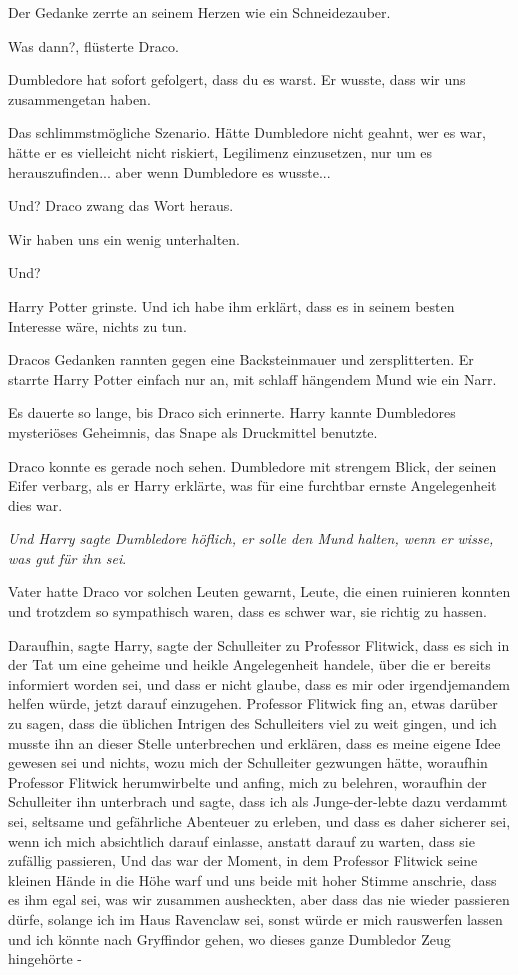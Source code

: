 Der Gedanke zerrte an seinem Herzen wie ein Schneidezauber.

\glqq{}Was dann?\grqq{}, flüsterte Draco.

\glqq{}Dumbledore hat sofort gefolgert, dass du es warst. Er wusste, dass wir
uns zusammengetan haben.\grqq{}

Das schlimmstmögliche Szenario. Hätte Dumbledore nicht geahnt, wer es war, hätte
er es vielleicht nicht riskiert, Legilimenz einzusetzen, nur um es
herauszufinden... aber wenn Dumbledore es wusste...

\glqq{}Und?\grqq{} Draco zwang das Wort heraus.

\glqq{}Wir haben uns ein wenig unterhalten.\grqq{}

\glqq{}Und?\grqq{}

Harry Potter grinste. \glqq{}Und ich habe ihm erklärt, dass es in seinem besten
Interesse wäre, nichts zu tun.\grqq{}

Dracos Gedanken rannten gegen eine Backsteinmauer und zersplitterten. Er starrte
Harry Potter einfach nur an, mit schlaff hängendem Mund wie ein Narr.

Es dauerte so lange, bis Draco sich erinnerte. Harry kannte Dumbledores
mysteriöses Geheimnis, das Snape als Druckmittel benutzte.

Draco konnte es gerade noch sehen. Dumbledore mit strengem Blick, der seinen
Eifer verbarg, als er Harry erklärte, was für eine furchtbar ernste
Angelegenheit dies war.


\emph{Und Harry sagte Dumbledore höflich, er solle den Mund halten, wenn er
wisse, was gut für ihn sei}.

Vater hatte Draco vor solchen Leuten gewarnt, Leute, die einen ruinieren konnten
und trotzdem so sympathisch waren, dass es schwer war, sie richtig zu hassen.

\glqq{}Daraufhin\grqq{}, sagte Harry, \glqq{}sagte der Schulleiter zu Professor
Flitwick, dass es sich in der Tat um eine geheime und heikle Angelegenheit
handele, über die er bereits informiert worden sei, und dass er nicht glaube,
dass es mir oder irgendjemandem helfen würde, jetzt darauf einzugehen. Professor
Flitwick fing an, etwas darüber zu sagen, dass die üblichen Intrigen des
Schulleiters viel zu weit gingen, und ich musste ihn an dieser Stelle
unterbrechen und erklären, dass es meine eigene Idee gewesen sei und nichts,
wozu mich der Schulleiter gezwungen hätte, woraufhin Professor Flitwick
herumwirbelte und anfing, mich zu belehren, woraufhin der Schulleiter ihn
unterbrach und sagte, dass ich als Junge-der-lebte dazu verdammt sei, seltsame
und gefährliche Abenteuer zu erleben, und dass es daher sicherer sei, wenn ich
mich absichtlich darauf einlasse, anstatt darauf zu warten, dass sie zufällig
passieren, Und das war der Moment, in dem Professor Flitwick seine kleinen Hände
in die Höhe warf und uns beide mit hoher Stimme anschrie, dass es ihm egal sei,
was wir zusammen ausheckten, aber dass das nie wieder passieren dürfe, solange
ich im Haus Ravenclaw sei, sonst würde er mich rauswerfen lassen und ich könnte
nach Gryffindor gehen, wo dieses ganze Dumbledor Zeug hingehörte -\grqq{}

